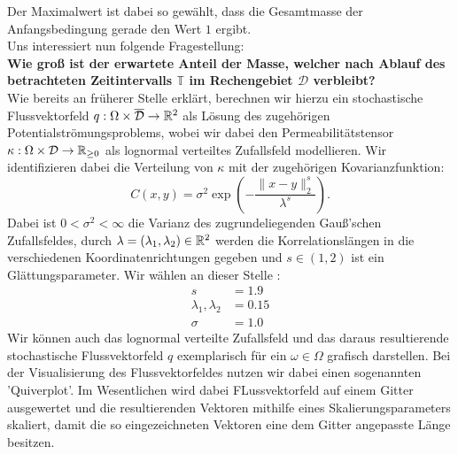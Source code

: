 Der Maximalwert ist dabei so gewählt, dass die Gesamtmasse der Anfangsbedingung gerade den Wert $ 1 $ ergibt.\\
Uns interessiert nun folgende Fragestellung: \\
\textbf{Wie groß ist der erwartete Anteil der Masse, welcher nach Ablauf des betrachteten Zeitintervalls $ \mathbb{T} $ im Rechengebiet $ \mathcal{D} $ verbleibt?}\\

Wie bereits an früherer Stelle erklärt, berechnen wir hierzu ein stochastische Flussvektorfeld $ q : \Omega \times \overline{\mathcal{ D}} \to \mathbb{R}^2 $ als Lösung des zugehörigen Potentialströmungsproblems, wobei wir dabei den Permeabilitätstensor $ \kappa : \Omega \times \mathcal{D} \to \mathbb{R}_{\geq0} $ als lognormal verteiltes Zufallsfeld modellieren. Wir identifizieren dabei die Verteilung von $ \kappa $ mit der zugehörigen Kovarianzfunktion:
\[
 C(x,y) = \sigma^2 \exp(- \frac{\lVert x-y \rVert_2^s}{\lambda^s} ) .
\]
Dabei ist $ 0 < \sigma^2 < \infty $ die Varianz des zugrundeliegenden Gauß'schen Zufallsfeldes, durch $ \lambda = (\lambda_1,\lambda_2) \in \mathbb{R}^2 $ werden die Korrelationslängen in die verschiedenen Koordinatenrichtungen gegeben und $ s \in (1,2) $ ist ein Glättungsparameter. Wir wählen an dieser Stelle :
\begin{align*}
s &=  1.9\\
\lambda_1,\lambda_2 &= 0.15\\
\sigma &= 1.0
\end{align*}
Wir können auch das lognormal verteilte Zufallsfeld und das daraus resultierende stochastische Flussvektorfeld $ q $ exemplarisch für ein $ \omega \in \Omega $ grafisch darstellen. Bei der Visualisierung des Flussvektorfeldes nutzen wir dabei einen sogenannten 'Quiverplot'. Im Wesentlichen wird dabei FLussvektorfeld auf einem Gitter ausgewertet und die resultierenden Vektoren mithilfe eines Skalierungsparameters skaliert, damit die so eingezeichneten Vektoren eine dem Gitter angepasste Länge besitzen.

